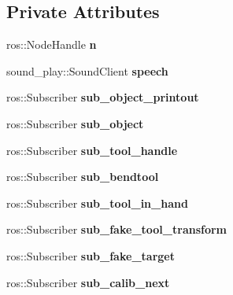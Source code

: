 \subsection*{Private Attributes}
\begin{DoxyCompactItemize}
\item 
\mbox{\label{structManipulate_abd8097dcac062850c589c0154d2ae9ba}} 
ros\+::\+Node\+Handle {\bfseries n}
\item 
\mbox{\label{structManipulate_ac510ae0f52da37bc5729b428e18e0656}} 
sound\+\_\+play\+::\+Sound\+Client {\bfseries speech}
\item 
\mbox{\label{structManipulate_a213216a189b0b1993ff3d44b9f286a18}} 
ros\+::\+Subscriber {\bfseries sub\+\_\+object\+\_\+printout}
\item 
\mbox{\label{structManipulate_a7821cdd6a833ec54caf82696ce2667e3}} 
ros\+::\+Subscriber {\bfseries sub\+\_\+object}
\item 
\mbox{\label{structManipulate_a89ce4416de1cd596e198536b398e2997}} 
ros\+::\+Subscriber {\bfseries sub\+\_\+tool\+\_\+handle}
\item 
\mbox{\label{structManipulate_a7f5cf48ae3e9aa4ccd6b871a95fc33b6}} 
ros\+::\+Subscriber {\bfseries sub\+\_\+bendtool}
\item 
\mbox{\label{structManipulate_ac0907a45a1fcec51816e90413edd4df5}} 
ros\+::\+Subscriber {\bfseries sub\+\_\+tool\+\_\+in\+\_\+hand}
\item 
\mbox{\label{structManipulate_acf6aecf64301f96da22156ed1b3ede58}} 
ros\+::\+Subscriber {\bfseries sub\+\_\+fake\+\_\+tool\+\_\+transform}
\item 
\mbox{\label{structManipulate_a7646b18fb57daa6675d3da3d0b05284c}} 
ros\+::\+Subscriber {\bfseries sub\+\_\+fake\+\_\+target}
\item 
\mbox{\label{structManipulate_a77e54004b68462602fb4043b31f9fbf3}} 
ros\+::\+Subscriber {\bfseries sub\+\_\+calib\+\_\+next}
\item 

\end{DoxyCompactItemize}

